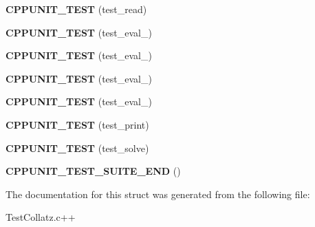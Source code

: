 \begin{DoxyCompactItemize}
\item 
\hypertarget{structTestCollatz_a3061012563bf19268d148200f1bb055d}{
{\bfseries CPPUNIT\_\-TEST} (test\_\-read)}
\label{structTestCollatz_a3061012563bf19268d148200f1bb055d}

\item 
\hypertarget{structTestCollatz_af69059f6cdb4ded7130cb14cf80b1525}{
{\bfseries CPPUNIT\_\-TEST} (test\_\-eval\_)}
\label{structTestCollatz_af69059f6cdb4ded7130cb14cf80b1525}

\item 
\hypertarget{structTestCollatz_a965ad768f3f9ab56d815ce567ffd611e}{
{\bfseries CPPUNIT\_\-TEST} (test\_\-eval\_)}
\label{structTestCollatz_a965ad768f3f9ab56d815ce567ffd611e}

\item 
\hypertarget{structTestCollatz_a4d0f610175291eb85929214232edecd4}{
{\bfseries CPPUNIT\_\-TEST} (test\_\-eval\_)}
\label{structTestCollatz_a4d0f610175291eb85929214232edecd4}

\item 
\hypertarget{structTestCollatz_a43c52d7f4e36e0ef2f154ad4dbc475b6}{
{\bfseries CPPUNIT\_\-TEST} (test\_\-eval\_)}
\label{structTestCollatz_a43c52d7f4e36e0ef2f154ad4dbc475b6}

\item 
\hypertarget{structTestCollatz_a11b8f4e8f3525ecdb4fa30fe48b90ed1}{
{\bfseries CPPUNIT\_\-TEST} (test\_\-print)}
\label{structTestCollatz_a11b8f4e8f3525ecdb4fa30fe48b90ed1}

\item 
\hypertarget{structTestCollatz_a38e9261491d7b3221d15af0f25c88584}{
{\bfseries CPPUNIT\_\-TEST} (test\_\-solve)}
\label{structTestCollatz_a38e9261491d7b3221d15af0f25c88584}

\item 
\hypertarget{structTestCollatz_a0db0ebca89d8127a0b79e5133134c3af}{
{\bfseries CPPUNIT\_\-TEST\_\-SUITE\_\-END} ()}
\label{structTestCollatz_a0db0ebca89d8127a0b79e5133134c3af}

\end{DoxyCompactItemize}


The documentation for this struct was generated from the following file:\begin{DoxyCompactItemize}
\item 
TestCollatz.c++\end{DoxyCompactItemize}
